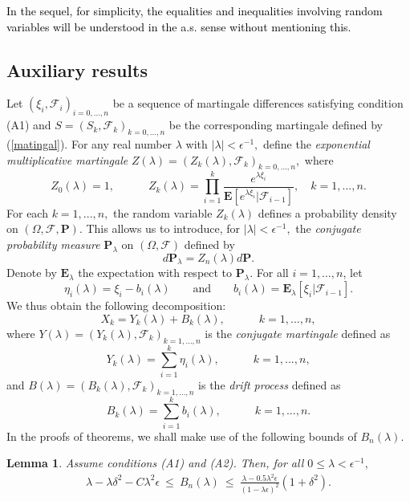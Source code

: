 \documentclass{gSTA2e}
\theoremstyle{plain}
\newtheorem{lemma}[theorem]{Lemma}
\theoremstyle{definition}
\theoremstyle{remark}
\begin{document}
\textcolor{black}{In the sequel, for simplicity, the equalities and inequalities involving random variables will be understood in the a.s. sense without mentioning this.
}

\subsection{Auxiliary results}
Let $(\xi _i,\mathcal{F}_i)_{i=0,...,n}$ be a sequence of martingale differences
satisfying condition (A1) and $S=(S_k,\mathcal{F}_k)_{k=0,...,n}$
be the corresponding martingale defined by (\ref{matingal}). For any real number $\lambda$ with $|\lambda| < \epsilon^{-1} ,$
define the \emph{exponential multiplicative martingale} $Z(\lambda
)=(Z_k(\lambda ),\mathcal{F}_k)_{k=0,...,n},$ where
\[
Z_0(\lambda )=1,\quad \quad \quad Z_k(\lambda )=\prod_{i=1}^k\frac{e^{\lambda \xi _i}}{\mathbf{E}[e^{\lambda \xi _i}|
\mathcal{F}_{i-1}]},\quad k=1,...,n.  \label{C-1}
\]
For each $k=1,...,n,$ the random variable $Z_k(\lambda
) $ defines a probability density on $(\Omega ,\mathcal{F},\mathbf{P}).$ This allows us to introduce, for $|\lambda|
 <\epsilon^{-1},$ the \emph{conjugate probability measure} $\mathbf{P}_\lambda $ on $(\Omega ,\mathcal{F})$ defined by
\begin{equation}
d\mathbf{P}_\lambda =Z_n(\lambda )d\mathbf{P}.  \label{f21}
\end{equation}
Denote by $\mathbf{E}_{\lambda}$ the expectation with respect to $\mathbf{P}_{\lambda}$.
For all $i=1,\dots,n$, let
\[
\eta_i(\lambda)=\xi_i - b_i(\lambda)\ \ \ \ \ \ \ \ \  \textrm{and} \ \ \ \  \ \ \  \ \  b_i(\lambda)=\mathbf{E}_{\lambda}[\xi_i |\mathcal{F}_{i-1}].  \]
We thus obtain the following decomposition:
\begin{equation}
X_k=Y_k(\lambda )+B_k(\lambda ),\quad\quad\quad k=1,...,n, \label{xb}
\end{equation}
where $Y(\lambda )=(Y_k(\lambda ),\mathcal{F}_k)_{k=1,...,n}$ is the \emph{conjugate martingale} defined as
\begin{equation}\label{f23}
Y_k(\lambda )=\sum_{i=1}^k\eta _i(\lambda ),\quad\quad\quad k=1,...,n,
\end{equation}
and
$B(\lambda )=(B_k(\lambda ),\mathcal{F}_k)_{k=1,...,n}$ is the \emph{drift process} defined as
\[
B_k(\lambda )=\sum_{i=1}^kb_i(\lambda ),\quad\quad\quad k=1,...,n.
\]
In the proofs of theorems, we shall  make use of the following bounds of $B_n(\lambda )$.
\begin{lemma}
\label{lemma1} Assume conditions (A1) and (A2). Then, for all $0 \leq \lambda < \epsilon^{-1} ,$
\begin{eqnarray*}
\lambda -\lambda\delta^2 - C \lambda^2\epsilon    \ \leq \  B_n(\lambda ) \ \leq \  \frac{\lambda-0.5\lambda^2\epsilon}{ (1-\lambda\epsilon)^2} \left(1+\delta^2 \right). 
\end{eqnarray*}
\end{lemma}
\end{document}
